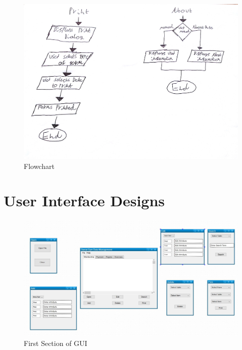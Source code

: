 \begin{figure}[H]
    \includegraphics[width=\textwidth]{flowchart1.jpg}
    \caption{Flowchart} \label{fig:Flowchart}
\end{figure}

\section{User Interface Designs}

\begin{figure}[H]
    \includegraphics[width=\textwidth]{GUI_DESIGNS.JPG}
    \caption{First Section of GUI} \label{fig:First Section of GUI}
\end{figure}

